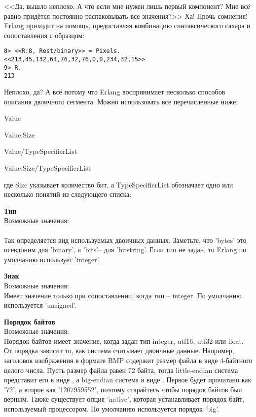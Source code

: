 <<Да, вышло неплохо.
А что если мне нужен лишь первый компонент?
Мне всё равно придётся постоянно распаковывать все значения?>>
Ха!
Прочь сомнения!
Erlang приходит на помощь, предоставляя комбинацию синтаксического сахара и сопоставления с образцом:
\begin{lstlisting}[style=repl]
8> <<R:8, Rest/binary>> = Pixels.
<<213,45,132,64,76,32,76,0,0,234,32,15>>
9> R.
213
\end{lstlisting}

Неплохо, да?
А всё потому что Erlang воспринимает несколько способов описания двоичного сегмента.
Можно использовать все перечисленные ниже:

Value

Value:Size

Value/TypeSpecifierList

Value:Size/TypeSpecifierList

где Size указывает количество бит, а TypeSpecifierList обозначает одно или несколько понятий из следующего списка:

\begin{minipage}{\textwidth}
\textbf{Тип}\\ 
Возможные значения: \\ 
\\  
Так определяется вид используемых двоичных данных.
Заметьте, что 'bytes' это псевдоним для 'binary', а 'bits'\--- для 'bitstring'.
Если тип не задан, то Erlang по умолчанию использует 'integer'.\\ 
\end{minipage}

\begin{minipage}{\textwidth}
    \textbf{Знак}\\ 
    Возможные значения: \\ 
    Имеет значение только при сопоставлении, когда тип \--- integer.
    По умолчанию используется 'unsigned'.\\ 
\end{minipage}

\begin{minipage}{\textwidth}
    \textbf{Порядок байтов}\\ 
    Возможные значения: \\ 
    Порядок байтов имеет значение, когда задан тип integer, utf16, utf32 или float.
    От порядка зависит то, как система считывает двоичные данные.
    Например, заголовок изображения в формате BMP содержит размер файла в виде 4\--байтного целого числа.
    Пусть размер файла равен 72 байта, тогда little\--endian система представит его в виде , а big\--endian система в виде .
    Первое будет прочитано как '72', а второе как '1207959552', поэтому старайтесь чтобы порядок байтов был верным.
    Также существует опция 'native', которая устанавливает порядок байт, используемый процессором.
    По умолчанию используется порядок 'big'.\\ 
\end{minipage}

